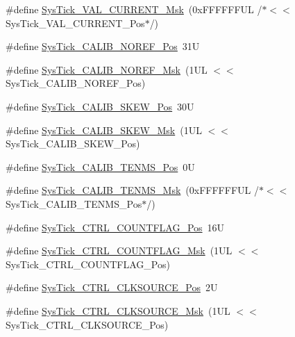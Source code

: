 \begin{DoxyCompactItemize}
\item 
\#define \hyperlink{group___c_m_s_i_s___sys_tick_gafc77b56d568930b49a2474debc75ab45}{Sys\-Tick\-\_\-\-V\-A\-L\-\_\-\-C\-U\-R\-R\-E\-N\-T\-\_\-\-Msk}~(0x\-F\-F\-F\-F\-F\-F\-U\-L /$\ast$$<$$<$ Sys\-Tick\-\_\-\-V\-A\-L\-\_\-\-C\-U\-R\-R\-E\-N\-T\-\_\-\-Pos$\ast$/)
\item 
\#define \hyperlink{group___c_m_s_i_s___sys_tick_ga534dbe414e7a46a6ce4c1eca1fbff409}{Sys\-Tick\-\_\-\-C\-A\-L\-I\-B\-\_\-\-N\-O\-R\-E\-F\-\_\-\-Pos}~31\-U
\item 
\#define \hyperlink{group___c_m_s_i_s___sys_tick_ga3af0d891fdd99bcc8d8912d37830edb6}{Sys\-Tick\-\_\-\-C\-A\-L\-I\-B\-\_\-\-N\-O\-R\-E\-F\-\_\-\-Msk}~(1\-U\-L $<$$<$ Sys\-Tick\-\_\-\-C\-A\-L\-I\-B\-\_\-\-N\-O\-R\-E\-F\-\_\-\-Pos)
\item 
\#define \hyperlink{group___c_m_s_i_s___sys_tick_gadd0c9cd6641b9f6a0c618e7982954860}{Sys\-Tick\-\_\-\-C\-A\-L\-I\-B\-\_\-\-S\-K\-E\-W\-\_\-\-Pos}~30\-U
\item 
\#define \hyperlink{group___c_m_s_i_s___sys_tick_ga8a6a85a87334776f33d77fd147587431}{Sys\-Tick\-\_\-\-C\-A\-L\-I\-B\-\_\-\-S\-K\-E\-W\-\_\-\-Msk}~(1\-U\-L $<$$<$ Sys\-Tick\-\_\-\-C\-A\-L\-I\-B\-\_\-\-S\-K\-E\-W\-\_\-\-Pos)
\item 
\#define \hyperlink{group___c_m_s_i_s___sys_tick_gacae558f6e75a0bed5d826f606d8e695e}{Sys\-Tick\-\_\-\-C\-A\-L\-I\-B\-\_\-\-T\-E\-N\-M\-S\-\_\-\-Pos}~0\-U
\item 
\#define \hyperlink{group___c_m_s_i_s___sys_tick_gaf1e68865c5aece2ad58971225bd3e95e}{Sys\-Tick\-\_\-\-C\-A\-L\-I\-B\-\_\-\-T\-E\-N\-M\-S\-\_\-\-Msk}~(0x\-F\-F\-F\-F\-F\-F\-U\-L /$\ast$$<$$<$ Sys\-Tick\-\_\-\-C\-A\-L\-I\-B\-\_\-\-T\-E\-N\-M\-S\-\_\-\-Pos$\ast$/)
\item 
\#define \hyperlink{group___c_m_s_i_s___sys_tick_gadbb65d4a815759649db41df216ed4d60}{Sys\-Tick\-\_\-\-C\-T\-R\-L\-\_\-\-C\-O\-U\-N\-T\-F\-L\-A\-G\-\_\-\-Pos}~16\-U
\item 
\#define \hyperlink{group___c_m_s_i_s___sys_tick_ga1bf3033ecccf200f59baefe15dbb367c}{Sys\-Tick\-\_\-\-C\-T\-R\-L\-\_\-\-C\-O\-U\-N\-T\-F\-L\-A\-G\-\_\-\-Msk}~(1\-U\-L $<$$<$ Sys\-Tick\-\_\-\-C\-T\-R\-L\-\_\-\-C\-O\-U\-N\-T\-F\-L\-A\-G\-\_\-\-Pos)
\item 
\#define \hyperlink{group___c_m_s_i_s___sys_tick_ga24fbc69a5f0b78d67fda2300257baff1}{Sys\-Tick\-\_\-\-C\-T\-R\-L\-\_\-\-C\-L\-K\-S\-O\-U\-R\-C\-E\-\_\-\-Pos}~2\-U
\item 
\#define \hyperlink{group___c_m_s_i_s___sys_tick_gaa41d06039797423a46596bd313d57373}{Sys\-Tick\-\_\-\-C\-T\-R\-L\-\_\-\-C\-L\-K\-S\-O\-U\-R\-C\-E\-\_\-\-Msk}~(1\-U\-L $<$$<$ Sys\-Tick\-\_\-\-C\-T\-R\-L\-\_\-\-C\-L\-K\-S\-O\-U\-R\-C\-E\-\_\-\-Pos)

\end{DoxyCompactItemize}
